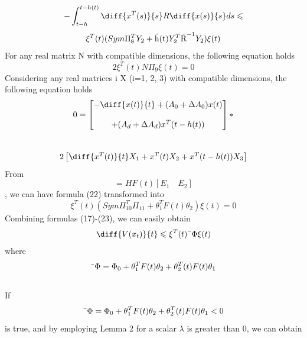 \documentclass[journal]{IEEEtran}
\begin{document}
\\
\begin{equation}
-\int^{t-h(t)}_{t-h}\diff{x^T(s)}{s}R\diff{x(s)}{s}ds \leqslant 
\end{equation}
\begin{equation}
\xi ^T (t)(Sym{\Pi^{T}_{8}Y_2} +\text{\~{h(t)}}Y^{T}_{2}\text{\~{R}}^{-1}Y_2)\xi (t)
\end{equation}
For any real matrix N with compatible dimensions, the following equation holds 
\begin{equation}
2\xi ^T (t)N\Pi_9\xi (t) = 0
\end{equation}
Considering any real matrices i X (i=1, 2, 3) with compatible dimensions, the following equation holds 
\begin{equation}
0 = 
\begin{bmatrix}
-\diff{x(t)}{t} + (A_0 + \Delta{A_0})x(t) \\ \\
+(A_d + \Delta{A_d})x^T(t - h(t)) 
\end{bmatrix}
*
\end{equation}
\\
\begin{equation}
2
\begin{bmatrix}
\diff{x^T(t)}{t}X_1 + x^T(t)X_2 + x^T(t - h(t))X_3
\end{bmatrix}
\end{equation}
From
\begin{equation}
[\Delta{A_0} \quad \Delta{A_d}] = HF(t)[E_1 \quad E_2]
\end{equation} 
, we can have formula (22) transformed into
\begin{equation}
\xi ^T (t)(Sym{\Pi^{T}_{10}\Pi_{11} + \theta^{T}_{1}F(t)\theta_2})\xi (t) = 0
\end{equation}
Combining formulas (17)-(23), we can easily obtain  
\begin{equation}
\diff{V(x_t)}{t}  \leqslant \xi ^T (t)\text{\={$\Phi$}}\xi(t)
\end{equation}
where
\begin{equation}
\text{\={$\Phi$}} = \Phi_0 + \theta^{T}_{1}F(t)\theta_2   +   \theta^{T}_{2}(t)F(t)\theta_1
\end{equation}
\\
If
\begin{equation}
\text{\={$\Phi$}} = \Phi_0 + \theta^{T}_{1}F(t)\theta_2   +   \theta^{T}_{2}(t)F(t)\theta_1   < 0
\end{equation}
 is true, and by employing Lemma 2 for a scalar $\lambda$ is greater than 0, we can obtain 
\end{document}
